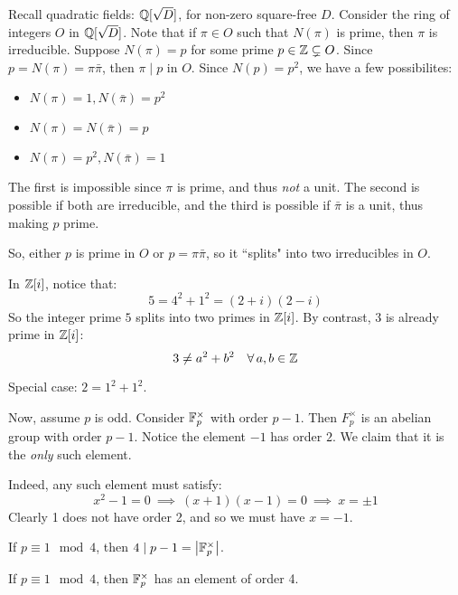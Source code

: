 Recall quadratic fields: $ \mathbb{Q}[\sqrt{D}] $, for non-zero square-free $ D $.
Consider the ring of integers $ O $ in $ \mathbb{Q}[\sqrt{D}] $.
Note that if $ \pi \in O $ such that $ N(\pi) $ is prime, then $ \pi $ is irreducible.
Suppose $ N(\pi) = p $ for some prime $ p \in \mathbb{Z} \subsetneq O $.
Since $ p = N(\pi) = \pi\bar{\pi} $, then $ \pi \mid p $ in $ O $.
Since $ N(p) = p^{2} $, we have a few possibilites:
\begin{itemize}
    \item $ N(\pi) = 1, N(\bar{\pi}) = p^{2} $
    \item $ N(\pi) = N(\bar{\pi}) = p $
    \item $ N(\pi) = p^{2}, N(\bar{\pi}) = 1 $
\end{itemize}
The first is impossible since $ \pi $ is prime, and thus \textit{not} a unit.
The second is possible if both are irreducible, and
the third is possible if $ \bar{\pi} $ is a unit, thus making $ p $ prime.

So, either $ p $ is prime in $ O $ or $ p = \pi\bar{\pi} $, so it ``splits" into two irreducibles
in $ O $.

\begin{xmp}[source=Primary Source Material]
    In $ \mathbb{Z}[i] $, notice that:
    \begin{equation*}
        5 = 4^{2} + 1^{2} = (2+i)(2-i)
    \end{equation*}
    So the integer prime $ 5 $ splits into two primes in $ \mathbb{Z}[i] $.
    By contrast, $ 3 $ is already prime in $ \mathbb{Z}[i] $:
    \begin{equation*}
        3 \neq a^{2} + b^{2} \quad \forall \, a,b \in \mathbb{Z}
    \end{equation*}
\end{xmp}
Special case: $ 2 = 1^{2} + 1^{2} $.

Now, assume $ p $ is odd. Consider $ \mathbb{F}_{p}^{\times} $ with order $ p-1 $.
Then $ F_{p}^{\times} $ is an abelian group with order $ p-1 $.
Notice the element $ -1 $ has order $ 2 $. We claim that it is the \textit{only} such element.

Indeed, any such element must satisfy:
\begin{equation*}
    x^{2}-1=0 \ \implies \ (x+1)(x-1)=0 \ \implies \ x = \pm 1
\end{equation*}
Clearly 1 does not have order 2, and so we must have $ x = -1 $.

If $ p \equiv 1 \mod 4 $, then $ 4 \mid p-1 = \abs{\mathbb{F}_{p}^{\times}} $.
\begin{lm}
    If $ p \equiv 1 \mod 4 $, then $ \mathbb{F}_{p}^{\times} $ has an element of order 4.
\end{lm}

